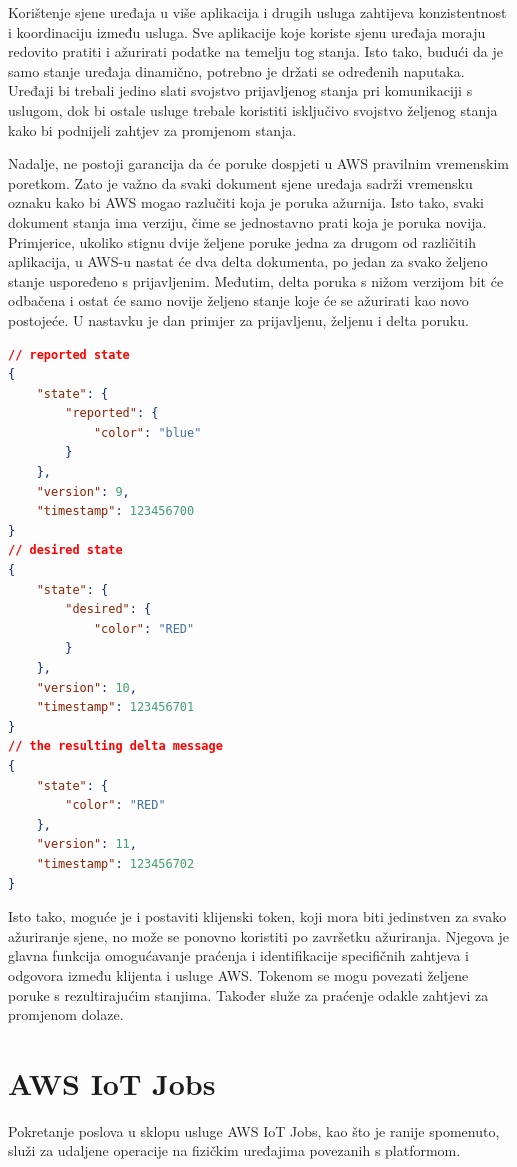 Korištenje sjene uređaja u više aplikacija i drugih usluga zahtijeva konzistentnost i koordinaciju između usluga. Sve aplikacije koje koriste sjenu uređaja moraju redovito pratiti i ažurirati podatke na temelju tog stanja. Isto tako, budući da je samo stanje uređaja dinamično, potrebno je držati se određenih naputaka. Uređaji bi trebali jedino slati svojstvo prijavljenog stanja pri komunikaciji s uslugom, dok bi ostale usluge trebale koristiti isključivo svojstvo željenog stanja kako bi podnijeli zahtjev za promjenom stanja. 

Nadalje, ne postoji garancija da će poruke dospjeti u AWS pravilnim vremenskim poretkom. Zato je važno da svaki dokument sjene uređaja sadrži vremensku oznaku  kako bi AWS mogao razlučiti koja je poruka ažurnija. Isto tako, svaki dokument stanja ima verziju, čime se jednostavno prati koja je poruka novija. Primjerice, ukoliko stignu dvije željene poruke jedna za drugom od različitih aplikacija, u AWS-u nastat će dva delta dokumenta, po jedan za svako željeno stanje uspoređeno s prijavljenim. Međutim, delta poruka s nižom verzijom bit će odbačena i ostat će samo novije željeno stanje koje će se ažurirati kao novo postojeće. U nastavku je dan primjer za prijavljenu, željenu i delta poruku. 

\begin{lstlisting}[caption={Poruke sjene uređaja}, language=json]
// reported state
{
	"state": {
		"reported": {
			"color": "blue"
		}
	},
	"version": 9,
	"timestamp": 123456700
}
// desired state
{
	"state": {
		"desired": {
			"color": "RED"
		}
	},
	"version": 10,
	"timestamp": 123456701
}
// the resulting delta message
{
	"state": {
		"color": "RED"
	},
	"version": 11,
	"timestamp": 123456702
}
\end{lstlisting}

Isto tako, moguće je i postaviti klijenski token, koji mora biti jedinstven za svako ažuriranje sjene, no može se ponovno koristiti po završetku ažuriranja. Njegova je glavna funkcija omogućavanje praćenja i identifikacije specifičnih zahtjeva i odgovora između klijenta i usluge AWS. Tokenom se mogu povezati željene poruke s rezultirajućim stanjima. Također služe za praćenje odakle zahtjevi za promjenom dolaze.  

\section{AWS IoT Jobs}

Pokretanje poslova u sklopu usluge AWS IoT Jobs, kao što je ranije spomenuto, služi za udaljene operacije na fizičkim uređajima povezanih s platformom. 

